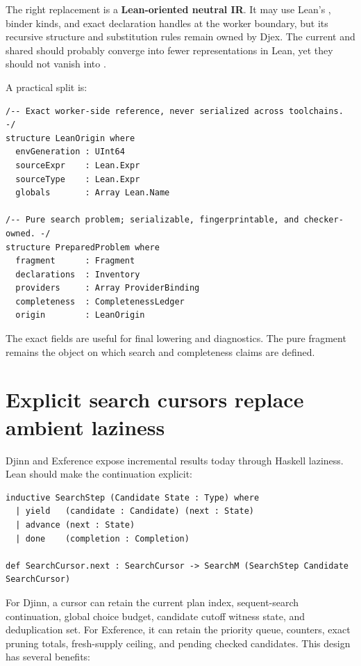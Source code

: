 \documentclass[10pt,letterpaper,oneside]{report}
\newcommand{\code}[1]{\texttt{\detokenize{#1}}}
\newcommand{\term}[1]{\textbf{#1}}
\begin{document}
The right replacement is a \term{Lean-oriented neutral IR}. It may use Lean's \code{Name}, binder kinds, and exact declaration handles at the worker boundary, but its recursive structure and substitution rules remain owned by Djex. The current \code{Frag} and shared \code{Type} should probably converge into fewer representations in Lean, yet they should not vanish into \code{Expr}.

A practical split is:

\begin{lstlisting}[language=Leanish]
/-- Exact worker-side reference, never serialized across toolchains. -/
structure LeanOrigin where
  envGeneration : UInt64
  sourceExpr    : Lean.Expr
  sourceType    : Lean.Expr
  globals       : Array Lean.Name

/-- Pure search problem; serializable, fingerprintable, and checker-owned. -/
structure PreparedProblem where
  fragment      : Fragment
  declarations  : Inventory
  providers     : Array ProviderBinding
  completeness  : CompletenessLedger
  origin        : LeanOrigin
\end{lstlisting}

The exact \code{Expr} fields are useful for final lowering and diagnostics. The pure fragment remains the object on which search and completeness claims are defined.

\section{Explicit search cursors replace ambient laziness}

Djinn and Exference expose incremental results today through Haskell laziness. Lean should make the continuation explicit:

\begin{lstlisting}[language=Leanish]
inductive SearchStep (Candidate State : Type) where
  | yield   (candidate : Candidate) (next : State)
  | advance (next : State)
  | done    (completion : Completion)

def SearchCursor.next : SearchCursor -> SearchM (SearchStep Candidate SearchCursor)
\end{lstlisting}

For Djinn, a cursor can retain the current plan index, sequent-search continuation, global choice budget, candidate cutoff witness state, and deduplication set. For Exference, it can retain the priority queue, counters, exact pruning totals, fresh-supply ceiling, and pending checked candidates. This design has several benefits:
\end{document}

